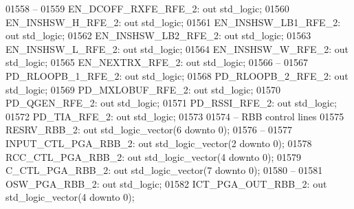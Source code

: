 \begin{DoxyCode}
01558 \textcolor{keyword}{        --}
01559         EN\_DCOFF\_RXFE\_RFE\_2:    \textcolor{keywordflow}{out} \textcolor{comment}{std\_logic};
01560         EN\_INSHSW\_H\_RFE\_2:  \textcolor{keywordflow}{out} \textcolor{comment}{std\_logic};
01561         EN\_INSHSW\_LB1\_RFE\_2:    \textcolor{keywordflow}{out} \textcolor{comment}{std\_logic};
01562         EN\_INSHSW\_LB2\_RFE\_2:    \textcolor{keywordflow}{out} \textcolor{comment}{std\_logic};
01563         EN\_INSHSW\_L\_RFE\_2:  \textcolor{keywordflow}{out} \textcolor{comment}{std\_logic};
01564         EN\_INSHSW\_W\_RFE\_2:  \textcolor{keywordflow}{out} \textcolor{comment}{std\_logic};
01565         EN\_NEXTRX\_RFE\_2:    \textcolor{keywordflow}{out} \textcolor{comment}{std\_logic};
01566 \textcolor{keyword}{        --}
01567         PD\_RLOOPB\_1\_RFE\_2:  \textcolor{keywordflow}{out} \textcolor{comment}{std\_logic};
01568         PD\_RLOOPB\_2\_RFE\_2:  \textcolor{keywordflow}{out} \textcolor{comment}{std\_logic};
01569         PD\_MXLOBUF\_RFE\_2:   \textcolor{keywordflow}{out} \textcolor{comment}{std\_logic};
01570         PD\_QGEN\_RFE\_2:  \textcolor{keywordflow}{out} \textcolor{comment}{std\_logic};
01571         PD\_RSSI\_RFE\_2:  \textcolor{keywordflow}{out} \textcolor{comment}{std\_logic};
01572         PD\_TIA\_RFE\_2:   \textcolor{keywordflow}{out} \textcolor{comment}{std\_logic};
01573 
01574 \textcolor{keyword}{        -- RBB control lines }
01575         RESRV\_RBB\_2:    \textcolor{keywordflow}{out} \textcolor{comment}{std\_logic\_vector}(\textcolor{vhdllogic}{}\textcolor{vhdllogic}{6} \textcolor{keywordflow}{downto} \textcolor{vhdllogic}{}\textcolor{vhdllogic}{0});
01576 \textcolor{keyword}{        --}
01577         INPUT\_CTL\_PGA\_RBB\_2:    \textcolor{keywordflow}{out} \textcolor{comment}{std\_logic\_vector}(\textcolor{vhdllogic}{}\textcolor{vhdllogic}{2} \textcolor{keywordflow}{downto} \textcolor{vhdllogic}{}\textcolor{vhdllogic}{0});
01578         RCC\_CTL\_PGA\_RBB\_2:  \textcolor{keywordflow}{out} \textcolor{comment}{std\_logic\_vector}(\textcolor{vhdllogic}{}\textcolor{vhdllogic}{4} \textcolor{keywordflow}{downto} \textcolor{vhdllogic}{}\textcolor{vhdllogic}{0});
01579         C\_CTL\_PGA\_RBB\_2:    \textcolor{keywordflow}{out} \textcolor{comment}{std\_logic\_vector}(\textcolor{vhdllogic}{}\textcolor{vhdllogic}{7} \textcolor{keywordflow}{downto} \textcolor{vhdllogic}{}\textcolor{vhdllogic}{0});
01580 \textcolor{keyword}{        --}
01581         OSW\_PGA\_RBB\_2:  \textcolor{keywordflow}{out} \textcolor{comment}{std\_logic};
01582         ICT\_PGA\_OUT\_RBB\_2:  \textcolor{keywordflow}{out} \textcolor{comment}{std\_logic\_vector}(\textcolor{vhdllogic}{}\textcolor{vhdllogic}{4} \textcolor{keywordflow}{downto} \textcolor{vhdllogic}{}\textcolor{vhdllogic}{0});

\end{DoxyCode}
